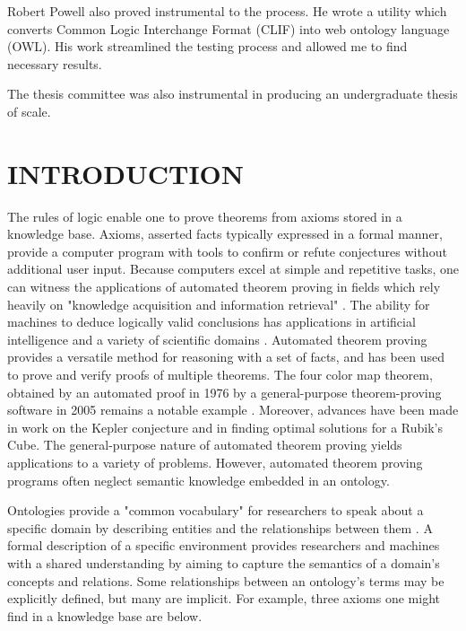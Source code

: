 \documentclass{article}
\begin{document}
Robert Powell also proved instrumental to the process. He wrote a utility which converts Common Logic Interchange Format (CLIF) into web ontology language (OWL). His work streamlined the testing process and allowed me to find necessary results. 

The thesis committee was also instrumental in producing an undergraduate thesis of scale.

\newpage
{}
\vspace*{.05in}
\listoffigures

\newpage
{}
\vspace*{.05in}
\listoftables

\newpage
{}
\tableofcontents

\newpage
{}
\setcounter{page}{1}
\vspace*{.05in}
\section{\MakeUppercase{Introduction}}

The rules of logic enable one to prove theorems from axioms stored in a knowledge base. Axioms, asserted facts typically expressed in a formal manner, provide a computer program with tools to confirm or refute conjectures without additional user input. Because computers excel at simple and repetitive tasks, one can witness the applications of automated theorem proving in fields which rely heavily on "knowledge acquisition and information retrieval" \cite{sanchez2012ontology}. The ability for machines to deduce logically valid conclusions has applications in artificial intelligence and a variety of scientific domains \cite{urban2011overview}. Automated theorem proving provides a versatile method for reasoning with a set of facts, and has been used to prove and verify proofs of multiple theorems. The four color map theorem, obtained by an automated proof in 1976 by a general-purpose theorem-proving software in 2005 remains a notable example \cite{gonthier2008formal}. Moreover, advances have been made in work on the Kepler conjecture and in finding optimal solutions for a Rubik's Cube. The general-purpose nature of automated theorem proving yields applications to a variety of problems. However, automated theorem proving programs often neglect semantic knowledge embedded in an ontology.

Ontologies provide a "common vocabulary" for researchers to speak about a specific domain by describing entities and the relationships between them \cite{noy2001ontology}. A formal description of a specific environment provides researchers and machines with a shared understanding by aiming to capture the semantics of a domain's concepts and relations. Some relationships between an ontology's terms may be explicitly defined, but many are implicit. For example, three axioms one might find in a knowledge base are below. 
\end{document}
